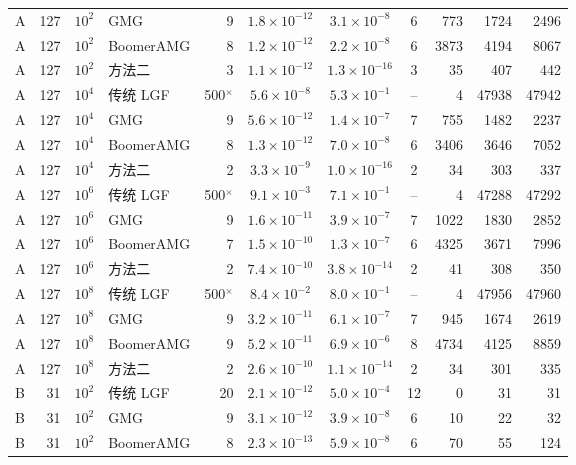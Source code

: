 \begin{longtable}{lrrlrcccrrr}
A & 127 & $10^{2}$ & GMG & 9 & $1.8{\times}10^{-12}$ & $3.1{\times}10^{-8}$ & 6 & 773 & 1724 & 2496 \\
A & 127 & $10^{2}$ & BoomerAMG & 8 & $1.2{\times}10^{-12}$ & $2.2{\times}10^{-8}$ & 6 & 3873 & 4194 & 8067 \\
A & 127 & $10^{2}$ & 方法二 & 3 & $1.1{\times}10^{-12}$ & $1.3{\times}10^{-16}$ & 3 & 35 & 407 & 442 \\
A & 127 & $10^{4}$ & 传统 LGF & 500$^\times$ & $5.6{\times}10^{-8}$ & $5.3{\times}10^{-1}$ & -- & 4 & 47938 & 47942 \\
A & 127 & $10^{4}$ & GMG & 9 & $5.6{\times}10^{-12}$ & $1.4{\times}10^{-7}$ & 7 & 755 & 1482 & 2237 \\
A & 127 & $10^{4}$ & BoomerAMG & 8 & $1.3{\times}10^{-12}$ & $7.0{\times}10^{-8}$ & 6 & 3406 & 3646 & 7052 \\
A & 127 & $10^{4}$ & 方法二 & 2 & $3.3{\times}10^{-9}$ & $1.0{\times}10^{-16}$ & 2 & 34 & 303 & 337 \\
A & 127 & $10^{6}$ & 传统 LGF & 500$^\times$ & $9.1{\times}10^{-3}$ & $7.1{\times}10^{-1}$ & -- & 4 & 47288 & 47292 \\
A & 127 & $10^{6}$ & GMG & 9 & $1.6{\times}10^{-11}$ & $3.9{\times}10^{-7}$ & 7 & 1022 & 1830 & 2852 \\
A & 127 & $10^{6}$ & BoomerAMG & 7 & $1.5{\times}10^{-10}$ & $1.3{\times}10^{-7}$ & 6 & 4325 & 3671 & 7996 \\
A & 127 & $10^{6}$ & 方法二 & 2 & $7.4{\times}10^{-10}$ & $3.8{\times}10^{-14}$ & 2 & 41 & 308 & 350 \\
A & 127 & $10^{8}$ & 传统 LGF & 500$^\times$ & $8.4{\times}10^{-2}$ & $8.0{\times}10^{-1}$ & -- & 4 & 47956 & 47960 \\
A & 127 & $10^{8}$ & GMG & 9 & $3.2{\times}10^{-11}$ & $6.1{\times}10^{-7}$ & 7 & 945 & 1674 & 2619 \\
A & 127 & $10^{8}$ & BoomerAMG & 9 & $5.2{\times}10^{-11}$ & $6.9{\times}10^{-6}$ & 8 & 4734 & 4125 & 8859 \\
A & 127 & $10^{8}$ & 方法二 & 2 & $2.6{\times}10^{-10}$ & $1.1{\times}10^{-14}$ & 2 & 34 & 301 & 335 \\
B & 31 & $10^{2}$ & 传统 LGF & 20 & $2.1{\times}10^{-12}$ & $5.0{\times}10^{-4}$ & 12 & 0 & 31 & 31 \\
B & 31 & $10^{2}$ & GMG & 9 & $3.1{\times}10^{-12}$ & $3.9{\times}10^{-8}$ & 6 & 10 & 22 & 32 \\
B & 31 & $10^{2}$ & BoomerAMG & 8 & $2.3{\times}10^{-13}$ & $5.9{\times}10^{-8}$ & 6 & 70 & 55 & 124 \\

\end{longtable}
